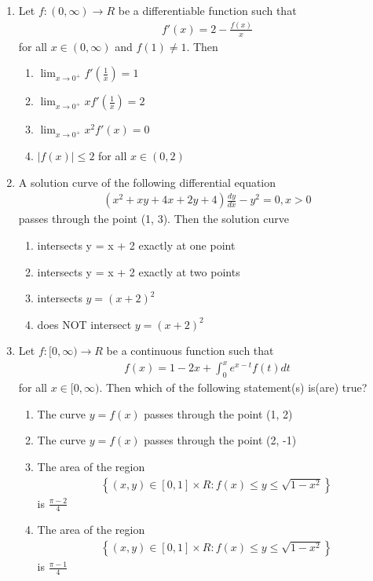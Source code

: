 \begin{enumerate}[label=\arabic*.,ref=\thesubsection.\theenumi]
\item Let $f: (0, \infty) \to R$ be a differentiable function such that
\begin{align*}
f'(x) = 2 - \frac{f(x)}{x}
\end{align*}
for all $x \in (0, \infty)$ and $f(1) \neq 1$. Then 
\begin{enumerate}
\item $\lim_{x \to 0^{+}}f'\left(\frac{1}{x}\right) = 1$
\item $\lim_{x \to 0^{+}}xf'\left(\frac{1}{x}\right) = 2$
\item $\lim_{x \to 0^{+}}x^2f'(x) = 0$
\item $|f(x)| \leq 2$ for all $x \in (0, 2)$
\end{enumerate}

\item A solution curve of the following differential equation
\begin{align*}
(x^2 + xy + 4x + 2y + 4)\frac{dy}{dx} - y^2 = 0, x > 0
\end{align*}
passes through the point (1, 3). Then the solution curve
\begin{enumerate}
\item intersects y = x + 2 exactly at one point
\item intersects y = x + 2 exactly at two points
\item intersects $y = (x + 2)^2$
\item does NOT intersect $y = (x + 2)^2$
\end{enumerate}

\item Let $f: [0, \infty) \to R$ be a continuous function such that
\begin{align*}
f(x) = 1 - 2x + \int_{0}^{x}e^{x - t}f(t)dt
\end{align*}
for all $x \in [0, \infty)$. Then which of the following statement(s) is(are) true?
\begin{enumerate}
\item The curve $y = f(x)$ passes through the point (1, 2)
\item The curve $y = f(x)$ passes through the point (2, -1)
\item The area of the region
\begin{align*}
\left\lbrace(x, y) \in [0, 1] \times R: f(x) \leq y \leq \sqrt{1 - x^2}\right\rbrace
\end{align*}
is $\frac{\pi - 2}{4}$
\item The area of the region
\begin{align*}
\left\lbrace(x, y) \in [0, 1] \times R: f(x) \leq y \leq \sqrt{1 - x^2}\right\rbrace
\end{align*}
is $\frac{\pi - 1}{4}$
\end{enumerate}


\end{enumerate}
